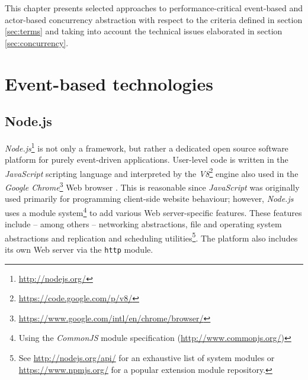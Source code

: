 This chapter presents selected approaches to performance-critical event-based and actor-based concurrency abstraction with respect to the criteria defined in section \ref{sec:terms} and taking into account the technical issues elaborated in section \ref{sec:concurrency}.

\section{Event-based technologies}
\label{sec:evnt}
\subsection{Node.js}
\label{sec:nodejs}

\textit{Node.js}\footnote{\url{http://nodejs.org/}} is not only a framework, but rather a dedicated open source software platform for purely event-driven applications. User-level code is written in the \textit{JavaScript} scripting language and interpreted by the \textit{V8}\footnote{\url{https://code.google.com/p/v8/}} engine also used in the \textit{Google Chrome}\footnote{\url{https://www.google.com/intl/en/chrome/browser/}} Web browser \cite[p. 19]{Hughes-Croucher2012}. This is reasonable since \textit{JavaScript} was originally used primarily for programming client-side website behaviour; however, \textit{Node.js} uses a module system\footnote{Using the \textit{CommonJS} module specification (\url{http://www.commonjs.org/})} to add various Web server-specific features. These features include -- among others -- networking abstractions, file and operating system abstractions and replication and scheduling utilities\footnote{See \url{http://nodejs.org/api/} for an exhaustive list of system modules or \url{https://www.npmjs.org/} for a popular extension module repository.}. The platform also includes its own Web server via the \texttt{http} module.

